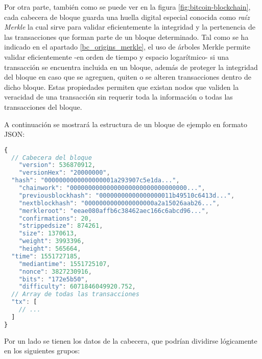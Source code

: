 Por otra parte, también como se puede ver en la figura \ref{fig:bitcoin-blockchain}, cada cabecera de bloque guarda una huella digital especial conocida como \textit{raíz Merkle} la cual sirve para validar eficientemente la integridad y la pertenencia de las transacciones que forman parte de un bloque determinado. Tal como se ha indicado en el apartado \ref{bc_origins_merkle}, el uso de árboles Merkle permite validar eficientemente -en orden de tiempo y espacio logarítmico- si una transacción se encuentra incluida en un bloque, además de proteger la integridad del bloque en caso que se agreguen, quiten o se alteren transacciones dentro de dicho bloque. Estas propiedades permiten que existan nodos que validen la veracidad de una transacción sin requerir toda la información o todas las transacciones del bloque.

A continuación se mostrará la estructura de un bloque de ejemplo en formato JSON:

\begin{minipage}{\linewidth}
\begin{lstlisting}[frame=single, belowskip=1em, aboveskip=2em,  language=javascript, captionpos=b, caption=Estructura JSON de un bloque en Bitcoin, label={lst:estructura_bloque}]
{
  // Cabecera del bloque
	"version": 536870912,
	"versionHex": "20000000",
  "hash": "0000000000000000001a293907c5e1da...",
	"chainwork": "00000000000000000000000000000000...",
	"previousblockhash": "00000000000000000011b49510c6413d...",
	"nextblockhash": "0000000000000000000a2a15026aab26...",
	"merkleroot": "eeae080affb6c38462aec166c6abcd96...",
	"confirmations": 20,
	"strippedsize": 874261,
	"size": 1370613,
	"weight": 3993396,
	"height": 565664,
  "time": 1551727185,
	"mediantime": 1551725107,
	"nonce": 3827230916,
	"bits": "172e5b50",
	"difficulty": 6071846049920.752,
  // Array de todas las transacciones
  "tx": [
    // ...
  ]
}
\end{lstlisting}
\end{minipage}

Por un lado se tienen los datos de la cabecera, que podrían dividirse lógicamente en los siguientes grupos:

